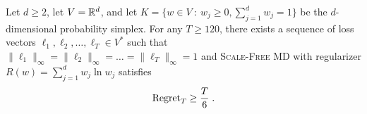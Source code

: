 \begin{theorem}
\label{theorem:second-counter-example}
Let $d \ge 2$, let $V = \mathbb{R}^d$, and let $K = \{ w \in V ~:~ w_j \ge 0,
\sum_{j=1}^d w_j = 1 \}$ be the $d$-dimensional probability simplex.  For any
$T \ge 120$, there exists a sequence of loss vectors $\ell_1, \ell_2, \dots,
\ell_T \in V^*$ such that $\|\ell_1\|_\infty = \|\ell_2\|_\infty = \dots =
\|\ell_T\|_\infty = 1$ and \textsc{Scale-Free MD} with regularizer
$R(w) = \sum_{j=1}^d w_j \ln w_j$ satisfies
$$
\operatorname{Regret}_T \ge \frac{T}{6} \; .
$$
\end{theorem}
